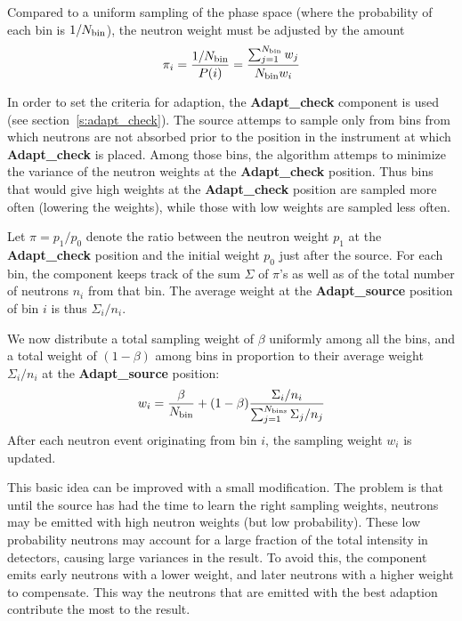 Compared to a uniform sampling of the phase space (where the probability
of each bin is $1/N_{\rm bin}$), the neutron weight
must be adjusted by the amount
\begin{equation}
\pi_i = \frac{1/N_{\rm bin}}{P(i)} =
    \frac{\sum_{j=1}^{N_{\rm bin}} w_j}{N_{\rm bin} w_i}
\end{equation}

In order to set the criteria for adaption, the {\bf Adapt\_check} component is
used (see section~\ref{s:adapt_check}). The source attemps to sample
only from bins from which neutrons are not absorbed prior to the
position in the instrument at which {\bf Adapt\_check} is
placed. Among those bins, the algorithm attemps to minimize the variance
of the neutron weights at the {\bf Adapt\_check} position. Thus bins that
would give high weights at the {\bf Adapt\_check} position are sampled more
often (lowering the weights), while those with low weights are sampled
less often.

Let $\pi = p_1/p_0$ denote the ratio between the neutron weight $p_1$ at
the {\bf Adapt\_check} position and the initial weight $p_0$ just after the
source. For each bin, the component keeps track of the sum $\Sigma$ of
$\pi$'s as well as of the total number of neutrons $n_i$ from that
bin. The average weight at the {\bf Adapt\_source} position of bin $i$ is thus
$\Sigma_i/n_i$.

We now distribute a total sampling weight of $\beta$ uniformly
among all the bins, and a total weight of $(1 - \beta)$ among bins in
proportion to their average weight $\Sigma_i/n_i$ at the {\bf Adapt\_source}
position:
\begin{equation}
w_i = \frac{\beta}{N_{\rm bin}} +
    (1-\beta) \frac{\Sigma_i/n_i}{\sum_{j=1}^{N_{\rm bins}} \Sigma_j/n_j}
\end{equation}
After each neutron event originating from bin $i$, the sampling weight $w_i$
is updated.

This basic idea can be improved with a small modification. The problem
is that until the source has had the time to learn the right sampling
weights, neutrons may be emitted with high neutron weights (but low
probability). These low probability neutrons may account for a large fraction of
the total intensity in detectors, causing large variances in the
result. To avoid this, the component emits early neutrons with a lower
weight, and later neutrons with a higher weight to compensate. This way
the neutrons that are emitted with the best adaption contribute the most
to the result.

